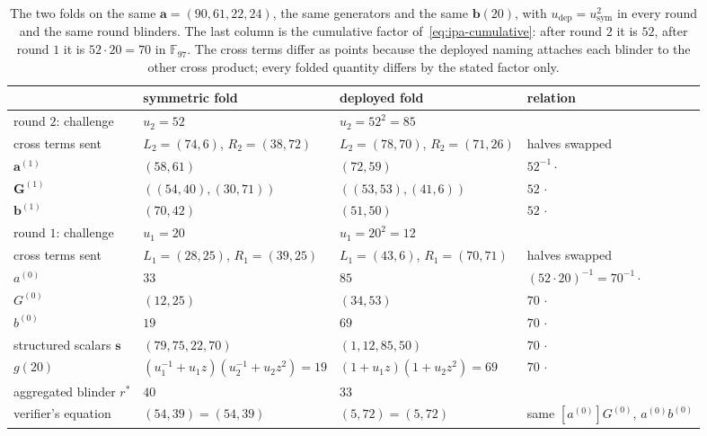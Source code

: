\documentclass[11pt,a4paper]{article}
\theoremstyle{definition}
\newcommand{\F}{\mathbb{F}}
\begin{document}
\begin{table}[htbp]
\centering
\footnotesize
\setlength{\tabcolsep}{5pt}
\begin{tabular}{l l l l}
\toprule
 & symmetric fold & deployed fold & relation \\
\midrule
round $2$: challenge & $u_2 = 52$ & $u_2 = 52^{2} = 85$ & \\
cross terms sent & $L_2 = (74, 6)$, $R_2 = (38, 72)$
  & $L_2 = (78, 70)$, $R_2 = (71, 26)$ & halves swapped \\
$\mathbf a^{(1)}$ & $(58, 61)$ & $(72, 59)$ & $52^{-1}\cdot$ \\
$\mathbf G^{(1)}$ & $((54, 40), (30, 71))$ & $((53, 53), (41, 6))$
  & $52\,\cdot$ \\
$\mathbf b^{(1)}$ & $(70, 42)$ & $(51, 50)$ & $52\,\cdot$ \\
\addlinespace
round $1$: challenge & $u_1 = 20$ & $u_1 = 20^{2} = 12$ & \\
cross terms sent & $L_1 = (28, 25)$, $R_1 = (39, 25)$
  & $L_1 = (43, 6)$, $R_1 = (70, 71)$ & halves swapped \\
$a^{(0)}$ & $33$ & $85$ & $(52 \cdot 20)^{-1} = 70^{-1}\cdot$ \\
$G^{(0)}$ & $(12, 25)$ & $(34, 53)$ & $70\,\cdot$ \\
$b^{(0)}$ & $19$ & $69$ & $70\,\cdot$ \\
\addlinespace
structured scalars $\mathbf s$ & $(79, 75, 22, 70)$ & $(1, 12, 85, 50)$
  & $70\,\cdot$ \\
$g(20)$ & $(u_1^{-1} + u_1 z)(u_2^{-1} + u_2 z^{2}) = 19$
  & $(1 + u_1 z)(1 + u_2 z^{2}) = 69$ & $70\,\cdot$ \\
aggregated blinder $r^{*}$ & $40$ & $33$ & \\
verifier's equation & $(54, 39) = (54, 39)$ & $(5, 72) = (5, 72)$
  & same $[a^{(0)}]G^{(0)}$, $a^{(0)} b^{(0)}$ \\
\bottomrule
\end{tabular}
\caption{The two folds on the same
$\mathbf a = (90, 61, 22, 24)$, the same generators and the same
$\mathbf b(20)$, with $u_{\mathrm{dep}} = u_{\mathrm{sym}}^{2}$ in
every round and the same round blinders. The last column is the
cumulative factor of~\eqref{eq:ipa-cumulative}: after round $2$ it is
$52$, after round $1$ it is $52 \cdot 20 = 70$ in $\F_{97}$. The cross
terms differ as points because the deployed naming attaches each
blinder to the other cross product; every folded quantity differs by
the stated factor only.}
\label{tab:ipa-sidebyside}
\end{table}
\end{document}
